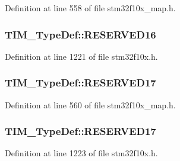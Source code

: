 Definition at line 558 of file stm32f10x\+\_\+map.\+h.

\subsubsection[{\texorpdfstring{R\+E\+S\+E\+R\+V\+E\+D16}{RESERVED16}}]{ T\+I\+M\+\_\+\+Type\+Def\+::\+R\+E\+S\+E\+R\+V\+E\+D16}\hypertarget{struct_t_i_m___type_def_ada594311432f31830545027e195980ed}{}\label{struct_t_i_m___type_def_ada594311432f31830545027e195980ed}


Definition at line 1221 of file stm32f10x.\+h.

\subsubsection[{\texorpdfstring{R\+E\+S\+E\+R\+V\+E\+D17}{RESERVED17}}]{ T\+I\+M\+\_\+\+Type\+Def\+::\+R\+E\+S\+E\+R\+V\+E\+D17}\hypertarget{struct_t_i_m___type_def_a8ef2e2fd6a92e75c5fd2647700b2fdb4}{}\label{struct_t_i_m___type_def_a8ef2e2fd6a92e75c5fd2647700b2fdb4}


Definition at line 560 of file stm32f10x\+\_\+map.\+h.

\subsubsection[{\texorpdfstring{R\+E\+S\+E\+R\+V\+E\+D17}{RESERVED17}}]{ T\+I\+M\+\_\+\+Type\+Def\+::\+R\+E\+S\+E\+R\+V\+E\+D17}\hypertarget{struct_t_i_m___type_def_aad6f1eb74535c7cda84b8ad8cb76d65e}{}\label{struct_t_i_m___type_def_aad6f1eb74535c7cda84b8ad8cb76d65e}


Definition at line 1223 of file stm32f10x.\+h.

